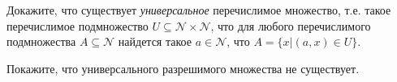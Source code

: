 \begin{enumcyr}
    \item Докажите, что существует \textit{универсальное} перечислимое множество, т.е. такое перечислимое подмножество $U
	    \subseteq \mathcal{N} \times \mathcal{N}$, что для любого перечислимого подмножества $A \subseteq \mathcal{N}$
        найдется такое $a \in \mathcal{N}$, что $A = \{x | (a, x) \in U\}$.
    \item Покажите, что универсального разрешимого множества не существует.
\end{enumcyr}